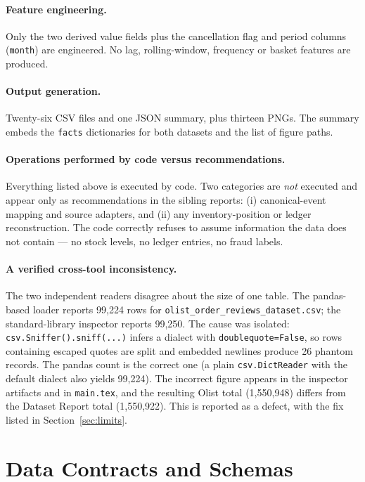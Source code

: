 \documentclass[11pt,a4paper]{article}
\newcommand{\code}[1]{\texttt{#1}}
\begin{document}
\paragraph{Feature engineering.} Only the two derived value fields plus the cancellation flag and period columns (\code{month}) are engineered. No lag, rolling-window, frequency or basket features are produced.

\paragraph{Output generation.} Twenty-six CSV files and one JSON summary, plus thirteen PNGs. The summary embeds the \code{facts} dictionaries for both datasets and the list of figure paths.

\paragraph{Operations performed by code versus recommendations.} Everything listed above is executed by code. Two categories are \emph{not} executed and appear only as recommendations in the sibling reports: (i) canonical-event mapping and source adapters, and (ii) any inventory-position or ledger reconstruction. The code correctly refuses to assume information the data does not contain --- no stock levels, no ledger entries, no fraud labels.

\paragraph{A verified cross-tool inconsistency.} The two independent readers disagree about the size of one table. The pandas-based loader reports 99{,}224 rows for \code{olist\_order\_reviews\_dataset.csv}; the standard-library inspector reports 99{,}250. The cause was isolated: \code{csv.Sniffer().sniff(...)} infers a dialect with \code{doublequote=False}, so rows containing escaped quotes are split and embedded newlines produce 26 phantom records. The pandas count is the correct one (a plain \code{csv.DictReader} with the default dialect also yields 99{,}224). The incorrect figure appears in the inspector artifacts and in \code{main.tex}, and the resulting Olist total (1{,}550{,}948) differs from the Dataset Report total (1{,}550{,}922). This is reported as a defect, with the fix listed in Section~\ref{sec:limits}.

\section{Data Contracts and Schemas}
\label{sec:schemas}
\end{document}
